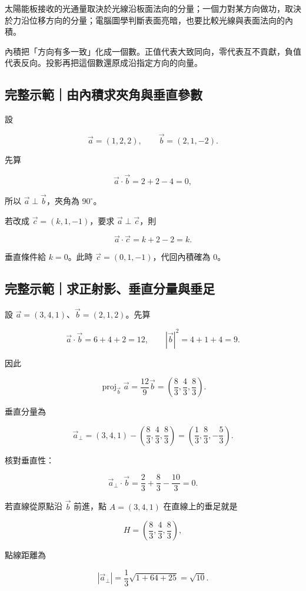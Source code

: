 \documentclass[11pt,a4paper]{article}
\begin{document}
太陽能板接收的光通量取決於光線沿板面法向的分量；一個力對某方向做功，取決於力沿位移方向的分量；電腦圖學判斷表面亮暗，也要比較光線與表面法向的內積。

內積把「方向有多一致」化成一個數。正值代表大致同向，零代表互不貢獻，負值代表反向。投影再把這個數還原成沿指定方向的向量。

\begin{HandoutWorkedExample}

\subsection{完整示範｜由內積求夾角與垂直參數}\label{ux5b8cux6574ux793aux7bc4ux7531ux5167ux7a4dux6c42ux593eux89d2ux8207ux5782ux76f4ux53c3ux6578}

設

\[
\vec a=(1,2,2),\qquad
\vec b=(2,1,-2).
\]

先算

\[
\vec a\cdot\vec b=2+2-4=0,
\]

所以 \(\vec a\perp\vec b\)，夾角為 \(90^\circ\)。

若改成 \(\vec c=(k,1,-1)\)，要求 \(\vec a\perp\vec c\)，則

\[
\vec a\cdot\vec c=k+2-2=k.
\]

垂直條件給 \(k=0\)。此時 \(\vec c=(0,1,-1)\)，代回內積確為 \(0\)。

\end{HandoutWorkedExample}

\begin{HandoutWorkedExample}

\subsection{完整示範｜求正射影、垂直分量與垂足}\label{ux5b8cux6574ux793aux7bc4ux6c42ux6b63ux5c04ux5f71ux5782ux76f4ux5206ux91cfux8207ux5782ux8db3}

設 \(\vec a=(3,4,1)\)、\(\vec b=(2,1,2)\)。先算

\[
\vec a\cdot\vec b=6+4+2=12,
\qquad
|\vec b|^2=4+1+4=9.
\]

因此

\[
\operatorname{proj}_{\vec b}\vec a
=\frac{12}{9}\vec b
=\left(\frac83,\frac43,\frac83\right).
\]

垂直分量為

\[
\vec a_\perp
=(3,4,1)-\left(\frac83,\frac43,\frac83\right)
=\left(\frac13,\frac83,-\frac53\right).
\]

核對垂直性：

\[
\vec a_\perp\cdot\vec b
=\frac23+\frac83-\frac{10}3=0.
\]

若直線從原點沿 \(\vec b\) 前進，點 \(A=(3,4,1)\) 在直線上的垂足就是

\[
H=\left(\frac83,\frac43,\frac83\right),
\]

點線距離為

\[
|\vec a_\perp|
=\frac13\sqrt{1+64+25}=\sqrt{10}.
\]

\end{HandoutWorkedExample}
\end{document}
